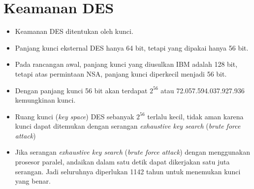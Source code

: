 \documentclass{article}
\begin{document}

\section*{Keamanan DES}

\begin{itemize}
    \item Keamanan DES ditentukan oleh kunci.
    \item Panjang kunci eksternal DES hanya 64 bit, tetapi yang dipakai hanya 56 bit.
    \item Pada rancangan awal, panjang kunci yang diusulkan IBM adalah 128 bit, tetapi atas permintaan NSA, panjang kunci diperkecil menjadi 56 bit.
    \item Dengan panjang kunci 56 bit akan terdapat $2^{56}$ atau 72.057.594.037.927.936 kemungkinan kunci.
    \item Ruang kunci (\textit{key space}) DES sebanyak $2^{56}$ terlalu kecil, tidak aman karena kunci dapat ditemukan dengan serangan \textit{exhaustive key search} (\textit{brute force attack})
    \item Jika serangan \textit{exhaustive key search} (\textit{brute force attack}) dengan menggunakan prosesor paralel, andaikan dalam satu detik dapat dikerjakan satu juta serangan. Jadi seluruhnya diperlukan 1142 tahun untuk menemukan kunci yang benar.
\end{itemize}
\end{document}
